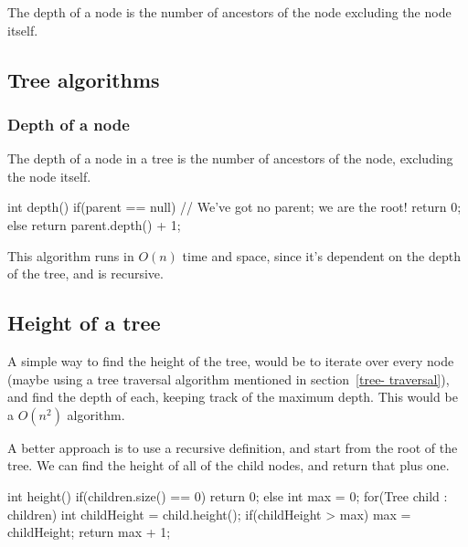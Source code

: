 The depth of a node is the number of ancestors of the node excluding the node
itself.


\subsection{Tree algorithms}

\subsubsection{Depth of a node}

The depth of a node in a tree is the number of ancestors of the node, excluding
the node itself.

\begin{javacode}
  int depth() {
    if(parent == null) { 
      // We've got no parent; we are the root!
      return 0;
    } else {
      return parent.depth() + 1;
    }
  }
\end{javacode}

This algorithm runs in $O(n)$ time and space, since it's dependent on the depth
of the tree, and is recursive.


\subsection{Height of a tree}

A simple way to find the height of the tree, would be to iterate over every node
(maybe using a tree traversal algorithm mentioned in section~\ref{tree-
traversal}), and find the depth of each, keeping track of the maximum depth.
This would be a $O(n^2)$ algorithm.

A better approach is to use a recursive definition, and start from the root of
the tree. We can find the height of all of the child nodes, and return that plus
one.

\begin{javacode}
  int height() {
    if(children.size() == 0) return 0;
    else {
      int max = 0;
      for(Tree child : children) {
        int childHeight = child.height();
        if(childHeight > max) max = childHeight;
      }
      return max + 1;
    }
  }
\end{javacode}

